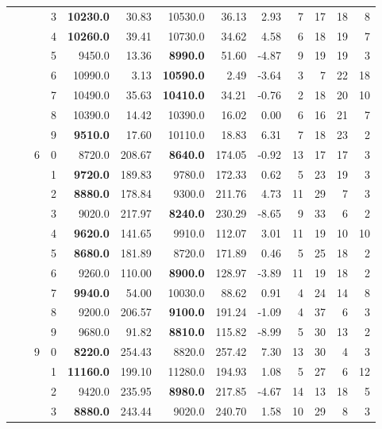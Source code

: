{\begin{longtable}{llcc|rr|rrr|rrrr}
 &  &  & 3 & \textbf{10230.0} & 30.83 & 10530.0 & 36.13 & 2.93 & 7 & 17 & 18 & 8 \\
 &  &  & 4 & \textbf{10260.0} & 39.41 & 10730.0 & 34.62 & 4.58 & 6 & 18 & 19 & 7 \\
 &  &  & 5 & 9450.0 & 13.36 & \textbf{8990.0} & 51.60 & -4.87 & 9 & 19 & 19 & 3 \\
 &  &  & 6 & 10990.0 & 3.13 & \textbf{10590.0} & 2.49 & -3.64 & 3 & 7 & 22 & 18 \\
 &  &  & 7 & 10490.0 & 35.63 & \textbf{10410.0} & 34.21 & -0.76 & 2 & 18 & 20 & 10 \\
 &  &  & 8 & 10390.0 & 14.42 & 10390.0 & 16.02 & 0.00 & 6 & 16 & 21 & 7 \\
 &  &  & 9 & \textbf{9510.0} & 17.60 & 10110.0 & 18.83 & 6.31 & 7 & 18 & 23 & 2 \\ \hline
 &  & 6 & 0 & 8720.0 & 208.67 & \textbf{8640.0} & 174.05 & -0.92 & 13 & 17 & 17 & 3 \\
 &  &  & 1 & \textbf{9720.0} & 189.83 & 9780.0 & 172.33 & 0.62 & 5 & 23 & 19 & 3 \\
 &  &  & 2 & \textbf{8880.0} & 178.84 & 9300.0 & 211.76 & 4.73 & 11 & 29 & 7 & 3 \\
 &  &  & 3 & 9020.0 & 217.97 & \textbf{8240.0} & 230.29 & -8.65 & 9 & 33 & 6 & 2 \\
 &  &  & 4 & \textbf{9620.0} & 141.65 & 9910.0 & 112.07 & 3.01 & 11 & 19 & 10 & 10 \\
 &  &  & 5 & \textbf{8680.0} & 181.89 & 8720.0 & 171.89 & 0.46 & 5 & 25 & 18 & 2 \\
 &  &  & 6 & 9260.0 & 110.00 & \textbf{8900.0} & 128.97 & -3.89 & 11 & 19 & 18 & 2 \\
 &  &  & 7 & \textbf{9940.0} & 54.00 & 10030.0 & 88.62 & 0.91 & 4 & 24 & 14 & 8 \\
 &  &  & 8 & 9200.0 & 206.57 & \textbf{9100.0} & 191.24 & -1.09 & 4 & 37 & 6 & 3 \\
 &  &  & 9 & 9680.0 & 91.82 & \textbf{8810.0} & 115.82 & -8.99 & 5 & 30 & 13 & 2 \\ \hline
 &  & 9 & 0 & \textbf{8220.0} & 254.43 & 8820.0 & 257.42 & 7.30 & 13 & 30 & 4 & 3 \\
 &  &  & 1 & \textbf{11160.0} & 199.10 & 11280.0 & 194.93 & 1.08 & 5 & 27 & 6 & 12 \\
 &  &  & 2 & 9420.0 & 235.95 & \textbf{8980.0} & 217.85 & -4.67 & 14 & 13 & 18 & 5 \\
 &  &  & 3 & \textbf{8880.0} & 243.44 & 9020.0 & 240.70 & 1.58 & 10 & 29 & 8 & 3 \\

\end{longtable}}
